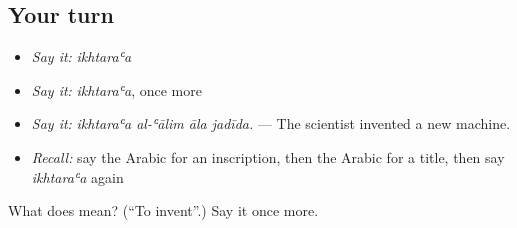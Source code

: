 \subsection*{Your turn}
\begin{itemize}
\raggedright
  \item \emph{Say it:} \emph{ikhtaraʿa}
  \item \emph{Say it:} \emph{ikhtaraʿa}, once more
  \item \emph{Say it:} \emph{ikhtaraʿa al-ʿālim āla jadīda.} — The scientist invented a new machine.
  \item \emph{Recall:} say the Arabic for an inscription, then the Arabic for a title, then say \emph{ikhtaraʿa} again
\end{itemize}

\begin{tcolorbox}[breakable,colback=teal!4,colframe=teal!35!black,title={Before you move on}]
What does  mean? (\textquotedblleft{}To invent\textquotedblright{}.) Say it once more.
\end{tcolorbox}
